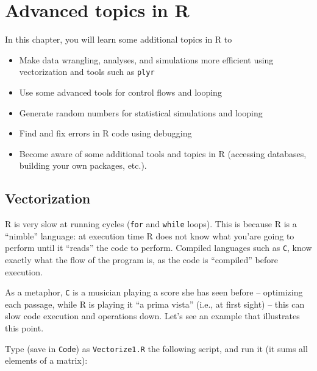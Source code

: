 \chapter{Advanced topics in {R}}
\label{chap:R_II}

In this chapter, you will learn some additional topics in R to
\begin{itemize}
	\item Make data wrangling, analyses, and simulations 
	more efficient using vectorization and tools such as {\tt plyr}

	\item Use some advanced tools for control flows and looping
	
	\item Generate random numbers for statistical simulations and looping
	
	\item Find and fix errors in R code using debugging 

	\item Become aware of some additional tools and topics in R 
	(accessing databases, building your own packages, etc.). 
	
\end{itemize}

\section{Vectorization}
R is very slow at running cycles ({\tt for} and {\tt while} loops). 
This is because R is a ``nimble'' language: at execution time R does 
not know what you'are going to perform until it ``reads'' the code to 
perform. Compiled languages such as {\tt C}, know exactly what the flow 
of the program is, as the code is ``compiled'' before execution. 

As a metaphor, {\tt C} is a musician playing a score she has seen 
before -- optimizing each passage, while R is playing it ``a prima 
vista'' (i.e., at first sight) -- this can slow code execution and 
operations down. Let's see an example that illustrates this point.

\begin{compactitem}[$\quad\star$]
		\item Type (save in {\tt Code}) as {\tt Vectorize1.R} the following
		script, and run it (it sums all elements of a matrix):
\end{compactitem}



